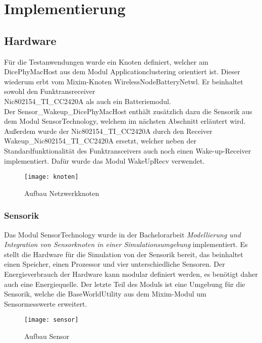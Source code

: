 \chapter{Implementierung}

\section{Hardware}

Für die Testanwendungen wurde ein Knoten definiert, welcher am DicePhyMacHost aus dem Modul Applicationclustering orientiert ist. Dieser wiederum erbt vom Mixim-Knoten WirelessNodeBatteryNetwl. Er beinhaltet sowohl den Funktransreceiver\\
Nic802154\_TI\_CC2420A als auch ein Batteriemodul. \\
Der Sensor\_Wakeup\_DicePhyMacHost enthält zusätzlich dazu die Sensorik aus dem Modul SensorTechnology, welchem im nächsten Abschnitt erläutert wird. Außerdem wurde der Nic802154\_TI\_CC2420A durch den Receiver \\
Wakeup\_Nic802154\_TI\_CC2420A ersetzt, welcher neben der Standardfunktionalität des Funktransceivers auch noch einen Wake-up-Receiver implementiert. Dafür wurde das Modul WakeUpRecv verwendet.

\begin{figure}[htbp]
\centering
\caption{Aufbau Netzwerkknoten}
\label{fig:routingbsp}
\texttt{[image: knoten]}
\end{figure}

\subsection{Sensorik}

Das Modul SensorTechnology wurde in der Bachelorarbeit \textit{Modellierung und Integration von Sensorknoten in einer Simulationsumgebung} implementiert. Es stellt die Hardware für die Simulation von der Sensorik bereit, das beinhaltet einen Speicher, einen Prozessor und vier unterschiedliche Sensoren. Der Energieverbrauch der Hardware kann modular definiert werden, es benötigt daher auch eine Energiequelle. Der letzte Teil des Moduls ist eine Umgebung für die Sensorik, welche die BaseWorldUtility aus dem Mixim-Modul um Sensormesswerte erweitert.

\begin{figure}[htbp]
\centering
\caption{Aufbau Sensor}
\label{fig:routingbsp}
\texttt{[image: sensor]}
\end{figure}

